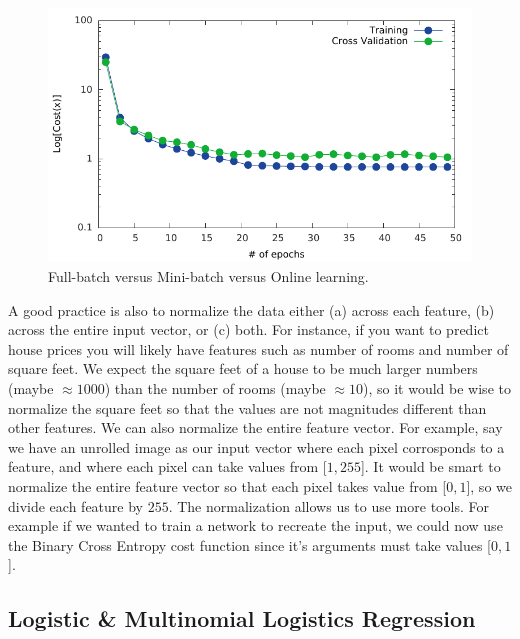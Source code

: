 \message{ !name(main.tex)}\documentclass[11pt]{article}
\begin{document}
\begin{figure}[H]
  \centering
  \includegraphics[width=0.5\linewidth]{epoch_mlp}
  \caption{Full-batch versus Mini-batch versus Online learning.}
  \label{fig:learning_size}
\end{figure}


A good practice is also to normalize the data either (a) across each feature, (b) across the entire input vector, or (c) both. For instance, if you want to predict house prices you will likely have features such as number of rooms and number of square feet. We expect the square feet of a house to be much larger numbers (maybe $\approx 1000$) than the number of rooms (maybe $\approx 10$), so it would be wise to normalize the square feet so that the values are not magnitudes different than other features. We can also normalize the entire feature vector. For example, say we have an unrolled image as our input vector where each pixel corrosponds to a feature, and where each pixel can take values from [$1,255$]. It would be smart to normalize the entire feature vector so that each pixel takes value from [$0,1$], so we divide each feature by $255$. The normalization allows us to use more tools. For example if we wanted to train a network to recreate the input, we could now use the Binary Cross Entropy cost function since it's arguments must take values [$0,1$].

\subsection{Logistic \& Multinomial Logistics Regression}
\end{document}
